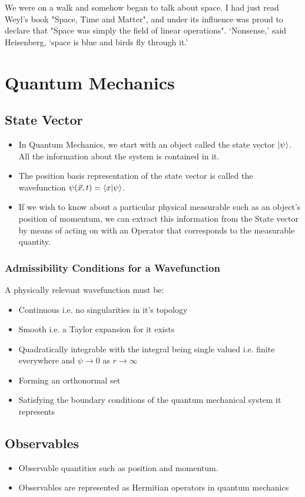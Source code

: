 \begin{savequote}[45mm]
We were on a walk and somehow began to talk about space.  I had just read Weyl’s book "Space, Time and Matter", and under its influence was proud to declare that "Space was simply the field of linear operations".  ‘Nonsense,’ said Heisenberg, ‘space  is  blue and birds  fly through it.’  
\end{savequote}
\chapter{Quantum Mechanics}
\label{ch:qm}

\section{State Vector}
\begin{itemize}
\item In Quantum Mechanics, we start with an object called the state vector $\ket{\psi}$. All the information about the system is contained in it. 
\item The position basis representation of the state vector is called the wavefunction $\psi (\vec{x}, t) = \braket{x}{\psi}$.
\item If we wish to know about a particular physical measurable such as an object's position of momentum, we can extract this information from the State vector by means of acting on with an Operator that corresponds to the measurable quantity.
\end{itemize}
\subsection{Admissibility Conditions for a Wavefunction}
A physically relevant wavefunction must be:
\begin{itemize}
\item Continuous i.e. no singularities in it's topology
\item Smooth i.e. a Taylor expansion for it exists
\item Quadratically integrable with the integral being single valued i.e. finite everywhere and $\psi \rightarrow 0$ as $r \rightarrow \infty$
\item Forming an orthonormal set
\item Satisfying the boundary conditions of the quantum mechanical system it represents
\end{itemize}
\section{Observables}
\begin{itemize}
\item Observable quantities such as position and momentum.
\item Observables are represented as Hermitian operators in quantum mechanics
\end{itemize}

